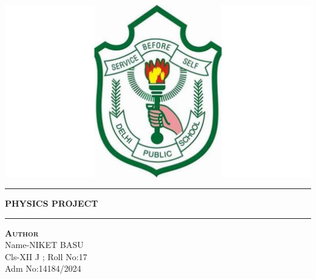 \documentclass[12pt,a4paper]{article}
\begin{document}
\begin{titlepage}
\begin{center}
\vspace{2cm}
\includegraphics[width=1\textwidth]{dpsSociety.jpg}\\[1cm]
\vspace{2cm}
\hrule
\vspace{.5cm}
{ \huge \bfseries PHYSICS PROJECT} %
\vspace{.5cm}
\hrule
\vspace{1.5cm}
\textsc{\textbf{Author}}\\
\vspace{.5cm}
\centering
Name-NIKET BASU\\
Cls-XII J ; Roll No:17\\
Adm No:14184/2024\\
\vspace{4cm}

\end{center}
\end{titlepage}

\author{Prepared by: Niket Basu}
\date{}


\pagestyle{fancy}
\fancyhf{} %
\rhead{\nouppercase{\rightmark}}
\cfoot{\thepage}
\setlength\headheight{16pt}
\setlength{\footskip}{50pt}

\end{document}
